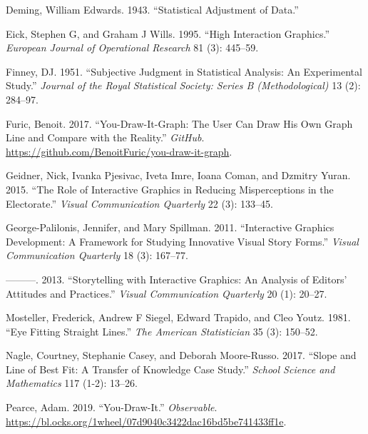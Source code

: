 \documentclass[
]{jds}
\newlength{\cslhangindent}
\newlength{\cslentryspacingunit} %
\newenvironment{CSLReferences}[2] %
 {%
  \setlength{\parindent}{0pt}
  \ifodd #1
  \let\oldpar\par
  \def\par{\hangindent=\cslhangindent\oldpar}
  \fi
  \setlength{\parskip}{#2\cslentryspacingunit}
 }%
 {}
\begin{document}
\begin{CSLReferences}{1}{0}
\leavevmode{}%
Deming, William Edwards. 1943. {``Statistical Adjustment of Data.''}

\leavevmode{}%
Eick, Stephen G, and Graham J Wills. 1995. {``High Interaction
Graphics.''} \emph{European Journal of Operational Research} 81 (3):
445--59.

\leavevmode{}%
Finney, DJ. 1951. {``Subjective Judgment in Statistical Analysis: An
Experimental Study.''} \emph{Journal of the Royal Statistical Society:
Series B (Methodological)} 13 (2): 284--97.

\leavevmode{}%
Furic, Benoit. 2017. {``You-Draw-It-Graph: The User Can Draw His Own
Graph Line and Compare with the Reality.''} \emph{GitHub}.
\url{https://github.com/BenoitFuric/you-draw-it-graph}.

\leavevmode{}%
Geidner, Nick, Ivanka Pjesivac, Iveta Imre, Ioana Coman, and Dzmitry
Yuran. 2015. {``The Role of Interactive Graphics in Reducing
Misperceptions in the Electorate.''} \emph{Visual Communication
Quarterly} 22 (3): 133--45.

\leavevmode{}%
George-Palilonis, Jennifer, and Mary Spillman. 2011. {``Interactive
Graphics Development: A Framework for Studying Innovative Visual Story
Forms.''} \emph{Visual Communication Quarterly} 18 (3): 167--77.

\leavevmode{}%
---------. 2013. {``Storytelling with Interactive Graphics: An Analysis
of Editors' Attitudes and Practices.''} \emph{Visual Communication
Quarterly} 20 (1): 20--27.

\leavevmode{}%
Mosteller, Frederick, Andrew F Siegel, Edward Trapido, and Cleo Youtz.
1981. {``Eye Fitting Straight Lines.''} \emph{The American Statistician}
35 (3): 150--52.

\leavevmode{}%
Nagle, Courtney, Stephanie Casey, and Deborah Moore-Russo. 2017.
{``Slope and Line of Best Fit: A Transfer of Knowledge Case Study.''}
\emph{School Science and Mathematics} 117 (1-2): 13--26.

\leavevmode{}%
Pearce, Adam. 2019. {``You-Draw-It.''} \emph{Observable}.
\url{https://bl.ocks.org/1wheel/07d9040c3422dac16bd5be741433ff1e}.


\end{CSLReferences}
\end{document}
